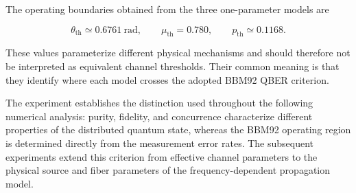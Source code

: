 The operating boundaries obtained from the three one-parameter models are

\begin{equation}
\boxed{
\theta_{\mathrm{th}}
\simeq
0.6761~\mathrm{rad},
\qquad
\mu_{\mathrm{th}}
=
0.780,
\qquad
p_{\mathrm{th}}
\simeq
0.1168.
}
\label{eq:exp1_boundaries_summary}
\end{equation}

These values parameterize different physical mechanisms and should therefore not
be interpreted as equivalent channel thresholds. Their common meaning is that
they identify where each model crosses the adopted BBM92 QBER criterion.

The experiment establishes the distinction used throughout the following
numerical analysis: purity, fidelity, and concurrence characterize different
properties of the distributed quantum state, whereas the BBM92 operating region
is determined directly from the measurement error rates. The subsequent
experiments extend this criterion from effective channel parameters to the
physical source and fiber parameters of the frequency-dependent propagation
model.